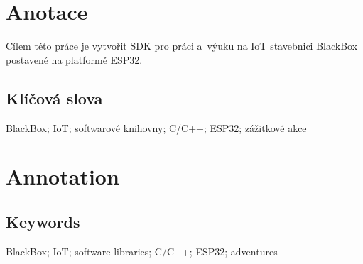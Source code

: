 \documentclass{template/socthesis}
\author{Tomáš Rohlínek}
\begin{document}
\maketitle



\pagestyle{empty}

\section*{Anotace}
Cílem této práce je vytvořit SDK pro práci a~výuku na IoT stavebnici BlackBox postavené na platformě ESP32.

\subsection*{Klíčová slova}
BlackBox; IoT; softwarové knihovny; C/C++; ESP32; zážitkové akce

\vspace{20mm}

\section*{Annotation}

\subsection*{Keywords}
BlackBox; IoT; software libraries; C/C++; ESP32; adventures

\newpage
\pagestyle{plain}

\tableofcontents %

\setcounter{figure}{0}
\setcounter{table}{0}
\newpage


















\end{document}
